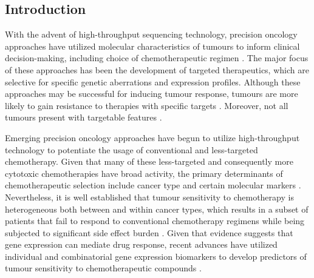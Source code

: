 \documentclass[10pt, letterpaper]{article}
\begin{document}
\begin{multicols*}{2}
\section{Introduction}
With the advent of high-throughput sequencing technology, precision oncology approaches have utilized molecular characteristics of tumours to inform clinical decision-making, including choice of chemotherapeutic regimen \cite{drugml, patient_resps}. The major focus of these approaches has been the development of targeted therapeutics, which are selective for specific genetic aberrations and expression profiles. Although these approaches may be successful for inducing tumour response, tumours are more likely to gain resistance to therapies with specific targets \cite{small_mol}. Moreover, not all tumours present with targetable features \cite{small_mol}.

Emerging precision oncology approaches have begun to utilize high-throughput technology to potentiate the usage of conventional and less-targeted chemotherapy. Given that many of these less-targeted and consequently more cytotoxic chemotherapies have broad activity, the primary determinants of chemotherapeutic selection include cancer type and certain molecular markers \cite{adverse}. Nevertheless, it is well established that tumour sensitivity to chemotherapy is heterogeneous both between and within cancer types, which results in a subset of patients that fail to respond to conventional chemotherapy regimens while being subjected to significant side effect burden \cite{adjuvant}. Given that evidence suggests that gene expression can mediate drug response, recent advances have utilized individual and combinatorial gene expression biomarkers to develop predictors of tumour sensitivity to chemotherapeutic compounds \cite{integrated}.


\end{multicols*}
\end{document}
